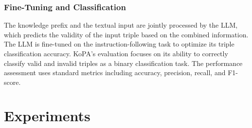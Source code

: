 \documentclass[12pt,a4paper]{article}
\begin{document}
\subsubsection{Fine-Tuning and Classification}

The knowledge prefix and the textual input are jointly processed by the LLM,
which predicts the validity of the input triple based on the combined information.
The LLM is fine-tuned on the instruction-following task to optimize its triple classification accuracy.
KoPA's evaluation focuses on its ability to correctly classify valid and invalid triples as a binary classification task.
The performance assessment uses standard metrics including accuracy, precision, recall, and F1-score.
%
%


\section{Experiments}\label{sec:experiments}
\end{document}
